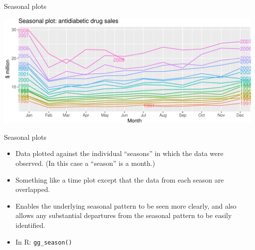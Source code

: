\documentclass[14pt,ignorenonframetext,aspectratio=169]{beamer}
\newenvironment{Shaded}{\begin{snugshade}}{\end{snugshade}}
\newcommand{\AttributeTok}[1]{\textcolor[rgb]{0.77,0.63,0.00}{#1}}
\newcommand{\FunctionTok}[1]{\textcolor[rgb]{0.00,0.00,0.00}{#1}}
\newcommand{\NormalTok}[1]{#1}
\newcommand{\SpecialCharTok}[1]{\textcolor[rgb]{0.00,0.00,0.00}{#1}}
\newcommand{\StringTok}[1]{\textcolor[rgb]{0.31,0.60,0.02}{#1}}
\providecommand{\tightlist}{%
  \setlength{\itemsep}{0pt}\setlength{\parskip}{0pt}}
\renewenvironment{Shaded}{\color{black}\begin{snugshade}\color{black}}{\end{snugshade}}
\renewenvironment{Shaded}{\color{black}\fontsize{10}{10}\sf\begin{snugshade}\color{black}}{\end{snugshade}}
\begin{document}
\begin{frame}[fragile]{Seasonal plots}
\protect\hypertarget{seasonal-plots}{}
\fontsize{10}{10}\sf

\begin{Shaded}
\end{Shaded}

\includegraphics{2-tsgraphics_files/figure-beamer/unnamed-chunk-12-1.pdf}
\end{frame}

\begin{frame}[fragile]{Seasonal plots}
\protect\hypertarget{seasonal-plots-1}{}
\begin{itemize}
\tightlist
\item
  Data plotted against the individual ``seasons'' in which the data were
  observed. (In this case a ``season'' is a month.)
\item
  Something like a time plot except that the data from each season are
  overlapped.
\item
  Enables the underlying seasonal pattern to be seen more clearly, and
  also allows any substantial departures from the seasonal pattern to be
  easily identified.
\item
  In R: \texttt{gg\_season()}
\end{itemize}
\end{frame}
\end{document}
